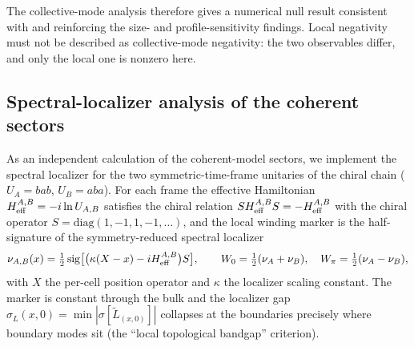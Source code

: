 \documentclass[aps,pra,preprint,superscriptaddress,amsmath,amssymb]{revtex4-2}
\begin{document}
The collective-mode analysis therefore gives a numerical null result consistent with and reinforcing the size- and profile-sensitivity findings. Local negativity must not be described as collective-mode negativity: the two observables differ, and only the local one is nonzero here.

\subsection{Spectral-localizer analysis of the coherent sectors}
\label{sec:localizer}

As an independent calculation of the coherent-model sectors, we implement the spectral localizer for the two symmetric-time-frame unitaries of the chiral chain ($U_A=bab$, $U_B=aba$). For each frame the effective Hamiltonian $H_{\rm eff}^{A,B}=-i\ln U_{A,B}$ satisfies the chiral relation $S H_{\rm eff}^{A,B} S=-H_{\rm eff}^{A,B}$ with the chiral operator $S=\mathrm{diag}(1,-1,1,-1,\dots)$, and the local winding marker is the half-signature of the symmetry-reduced spectral localizer~\cite{Ghosh2024Local,CerjanLoring2025Tutorial}
\begin{equation}
  \nu_{A,B}(x)=\tfrac{1}{2}\operatorname{sig}\bigl[\bigl(\kappa(X-x)-iH_{\rm eff}^{A,B}\bigr)S\bigr],
  \qquad W_0=\tfrac{1}{2}(\nu_A+\nu_B),\quad
  W_\pi=\tfrac{1}{2}(\nu_A-\nu_B),
\label{eq:localizer}
\end{equation}
with $X$ the per-cell position operator and $\kappa$ the localizer scaling constant. The marker is constant through the bulk and the localizer gap $\sigma_L(x,0)=\min|\sigma[\tilde L_{(x,0)}]|$ collapses at the boundaries precisely where boundary modes sit (the ``local topological bandgap'' criterion).
\end{document}
